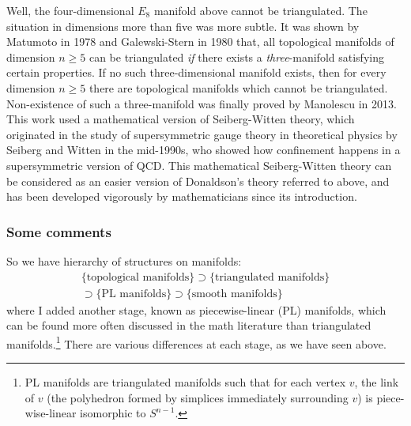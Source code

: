 \documentclass[12pt]{article}
\numberwithin{equation}{section}
\numberwithin{figure}{section}
\theoremstyle{remark}
\begin{document}
Well, the four-dimensional $E_8$ manifold above cannot be triangulated.
The situation in dimensions more than five was more subtle.
It was shown by Matumoto \cite{Matumoto} in 1978 and Galewski-Stern \cite{GalewskiStern} in 1980 that,
all topological manifolds of dimension $n\ge 5$ can be triangulated
\emph{if} there exists a \emph{three}-manifold satisfying certain properties.
If no such three-dimensional manifold exists,
then for every dimension $n\ge 5$ there are topological manifolds which cannot be triangulated.
Non-existence of such a three-manifold was finally proved by Manolescu \cite{Manolescu} in 2013.
This work used a mathematical version of Seiberg-Witten theory,
which originated in the study of supersymmetric gauge theory 
in theoretical physics by Seiberg and Witten in the mid-1990s,
who showed how confinement happens in a supersymmetric version of QCD.
This mathematical Seiberg-Witten theory 
can be considered as an easier version of Donaldson's theory referred to above,
and has been developed vigorously by mathematicians since its introduction.


\subsubsection{Some comments}
So we have hierarchy of structures on manifolds: \begin{multline}
  \{\text{topological manifolds}\}
  \supset
  \{\text{triangulated manifolds}\} \\
  \supset
  \{\text{PL manifolds}\}
  \supset
  \{\text{smooth manifolds}\}
\end{multline}
where I added another stage, known as piecewise-linear (PL) manifolds,
which can be found more often discussed in the math literature 
than triangulated manifolds.\footnote{%
PL manifolds are triangulated manifolds such that
for each vertex $v$, the link of $v$ (the polyhedron formed by 
simplices immediately surrounding $v$) is piece-wise-linear isomorphic to $S^{n-1}$.
}
There are various differences at each stage, as we have seen above.
\end{document}
